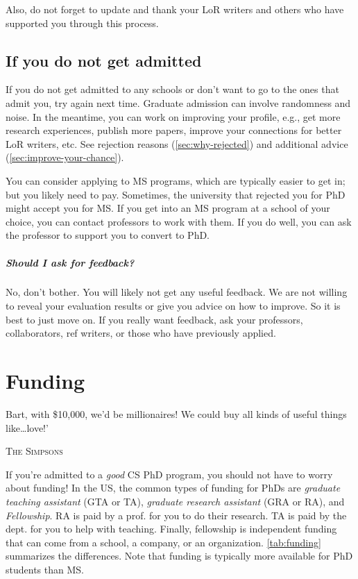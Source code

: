 \documentclass[oneside,11pt,dvipsnames]{book}
\begin{document}
Also, do not forget to update and thank your LoR writers and others who have supported you through this process.

\section{If you do not get admitted}\label{sec:not-accepted} 

If you do not get admitted to any schools or don't want to go to the ones that admit you, try again next time.  Graduate admission can involve randomness and noise. In the meantime, you can work on improving your profile, e.g., get more research experiences, publish more papers, improve your connections for better LoR writers, etc. See rejection reasons (\autoref{sec:why-rejected}) and additional advice (\autoref{sec:improve-your-chance}).

You can consider applying to MS programs, which are typically easier to get in; but you likely need to pay.  Sometimes, the university that rejected you for PhD might accept you for MS.
If you get into an MS program at a school of your choice, you can contact professors to work with them. If you do well, you can ask the professor to support you to convert to PhD.

\paragraph{Should I ask for feedback?}
No, don't bother.  You will likely not get any useful feedback.  We are not willing to reveal your evaluation results or give you advice on how to improve. So it is best to just move on.  If you really want feedback, ask your professors, collaborators, ref writers, or those who have previously applied.


\chapter{Funding}\label{sec:funding}

\epigraph{Bart, with \$10,000, we’d be millionaires! We could buy all kinds of useful things like…love!’}{\textsc{The Simpsons}}
If you're admitted to a \emph{good} CS PhD program, you should not have to worry about funding!
In the US, the common types of funding for PhDs are \emph{graduate teaching assistant} (GTA or TA), \emph{graduate research assistant} (GRA or RA), and \emph{Fellowship}.
RA is paid by a prof. for you to do their research. TA is paid by the dept. for you to help with teaching. Finally, fellowship is independent funding that can come from a school, a company, or an organization. \autoref{tab:funding} summarizes the differences.
Note that funding is typically more available for PhD students than
MS.
\end{document}
